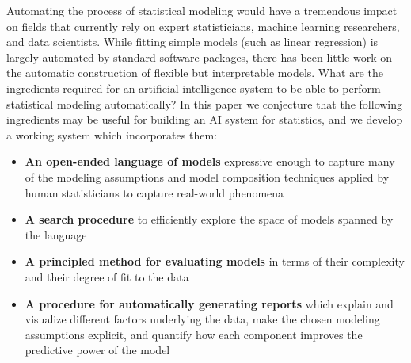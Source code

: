 


Automating the process of statistical modeling would have a tremendous impact on fields that currently rely on expert statisticians, machine learning researchers, and data scientists.
While fitting simple models (such as linear regression) is largely automated by standard software packages, there has been little work on the automatic construction of flexible but interpretable models. 
What are the ingredients required for an artificial intelligence system to be able to perform statistical modeling automatically? 
In this paper we conjecture that the following ingredients may be useful for building an AI system for statistics, and we develop a working system which incorporates them:
\begin{itemize}
\item {\bf An open-ended language of models} expressive enough to
  capture many of the modeling assumptions and model composition
  techniques  applied by human statisticians to capture real-world phenomena
\item {\bf A search procedure} to efficiently explore the space of
  models spanned by the language
\item {\bf A principled method for evaluating models} in terms of their complexity and their degree of fit to the
  data
\item {\bf A procedure for automatically generating reports} which
  explain and visualize different factors underlying the data, make
  the chosen modeling assumptions explicit, and quantify how each
  component improves the predictive power of the model 
\end{itemize}




